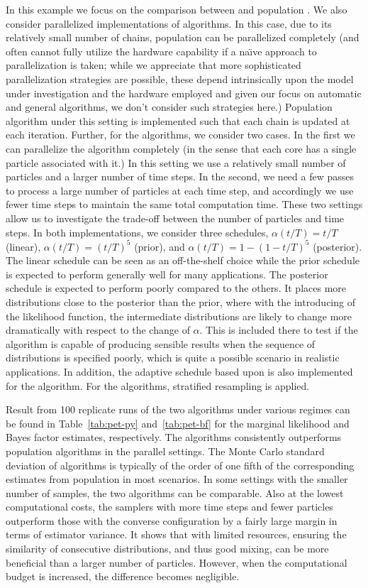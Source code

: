 In this example we focus on the comparison between \smc[2] and population \mcmc. We also consider parallelized implementations of algorithms. In this case, due to its relatively small number of chains, population \mcmc can be parallelized completely (and often cannot fully utilize the hardware capability if a na\"\i ve approach to parallelization is taken; while we appreciate that more sophisticated parallelization strategies are possible, these depend intrinsically upon the model under investigation and the hardware employed and given our focus on automatic and general algorithms, we don't consider such strategies here.) Population \mcmc algorithm under this setting is implemented such that each chain is updated at each iteration. Further, for the \smc algorithms, we consider two cases. In the first we can parallelize the algorithm completely (in the sense that each core has a single particle associated with it.) In this setting we use a relatively small number of particles and a larger number of time steps. In the second, we need a few passes to process a large number of particles at each time step, and accordingly we use fewer time steps to maintain the same total computation time. These two settings allow us to investigate the trade-off between the number of particles and time steps. In both implementations, we consider three schedules, $\alpha(t/T) = t/T$ (linear), $\alpha(t/T) = (t/T)^5$ (prior), and $\alpha(t/T) = 1 - (1 - t/T)^5$ (posterior). The linear schedule can be seen as an off-the-shelf choice while the prior schedule is expected to perform generally well for many applications. The posterior schedule is expected to perform poorly compared to the others. It places more distributions close to the posterior than the prior, where with the introducing of the likelihood function, the intermediate distributions are likely to change more dramatically with respect to the change of $\alpha$. This is included there to test if the algorithm is capable of producing sensible results when the sequence of distributions is specified poorly, which is quite a possible scenario in realistic applications. In addition, the adaptive schedule based upon \cess is also implemented for the \smc[2] algorithm. For the \smc algorithms, stratified resampling is applied.

Result from 100 replicate runs of the two algorithms under various regimes can be found in Table~\ref{tab:pet-py} and~\ref{tab:pet-bf} for the marginal likelihood and Bayes factor estimates, respectively. The \smc algorithms consistently outperforms population \mcmc algorithms in the parallel settings. The Monte Carlo standard deviation of \smc algorithms is typically of the order of one fifth of the corresponding estimates from population \mcmc in most scenarios. In some settings with the smaller number of samples, the two algorithms can be comparable. Also at the lowest computational costs, the samplers with more time steps and fewer particles outperform those with the converse configuration by a fairly large margin in terms of estimator variance. It shows that with limited resources, ensuring the similarity of consecutive distributions, and thus good mixing, can be more beneficial than a larger number of particles. However, when the computational budget is increased, the difference becomes negligible.

